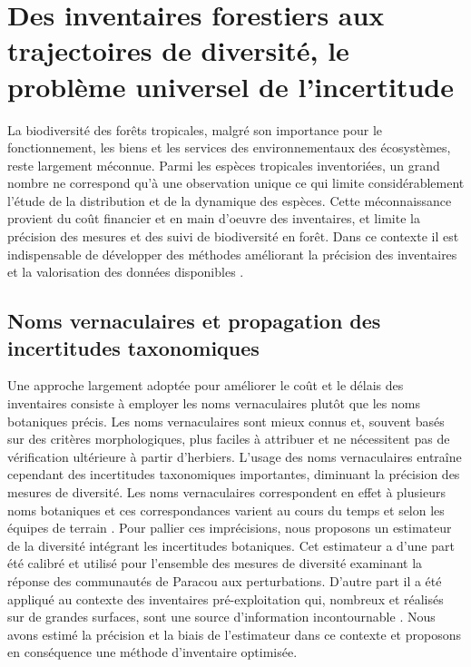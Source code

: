 \documentclass[
  11pt,
  french,
  A4paper,
  extrafontsizes,onecolumn,openright
  ]{memoir}
\begin{document}
\chapter{Des inventaires forestiers aux trajectoires de diversité, le
problème universel de
l'incertitude}\label{des-inventaires-forestiers-aux-trajectoires-de-diversite-le-probleme-universel-de-lincertitude}

La biodiversité des forêts tropicales, malgré son importance pour le
fonctionnement, les biens et les services des environnementaux des
écosystèmes, reste largement méconnue. Parmi les espèces tropicales
inventoriées, un grand nombre ne correspond qu'à une observation unique
\autocite{Feeley2011} ce qui limite considérablement l'étude de la
distribution et de la dynamique des espèces. Cette méconnaissance
provient du coût financier et en main d'oeuvre des inventaires, et
limite la précision des mesures et des suivi de biodiversité en forêt.
Dans ce contexte il est indispensable de développer des méthodes
améliorant la précision des inventaires et la valorisation des données
disponibles \autocite{Baraloto2012}.

\section{Noms vernaculaires et propagation des incertitudes
taxonomiques}\label{noms-vernaculaires-et-propagation-des-incertitudes-taxonomiques}

Une approche largement adoptée pour améliorer le coût et le délais des
inventaires consiste à employer les noms vernaculaires plutôt que les
noms botaniques précis. Les noms vernaculaires sont mieux connus et,
souvent basés sur des critères morphologiques, plus faciles à attribuer
et ne nécessitent pas de vérification ultérieure à partir d'herbiers.
L'usage des noms vernaculaires entraîne cependant des incertitudes
taxonomiques importantes, diminuant la précision des mesures de
diversité. Les noms vernaculaires correspondent en effet à plusieurs
noms botaniques et ces correspondances varient au cours du temps et
selon les équipes de terrain \autocite{Oldeman1968}. Pour pallier ces
imprécisions, nous proposons un estimateur de la diversité intégrant les
incertitudes botaniques. Cet estimateur a d'une part été calibré et
utilisé pour l'ensemble des mesures de diversité examinant la réponse
des communautés de Paracou aux perturbations. D'autre part il a été
appliqué au contexte des inventaires pré-exploitation qui, nombreux et
réalisés sur de grandes surfaces, sont une source d'information
incontournable \autocites{terSteege2000}{Guitet2014}. Nous avons estimé
la précision et la biais de l'estimateur dans ce contexte et proposons
en conséquence une méthode d'inventaire optimisée.
\end{document}
